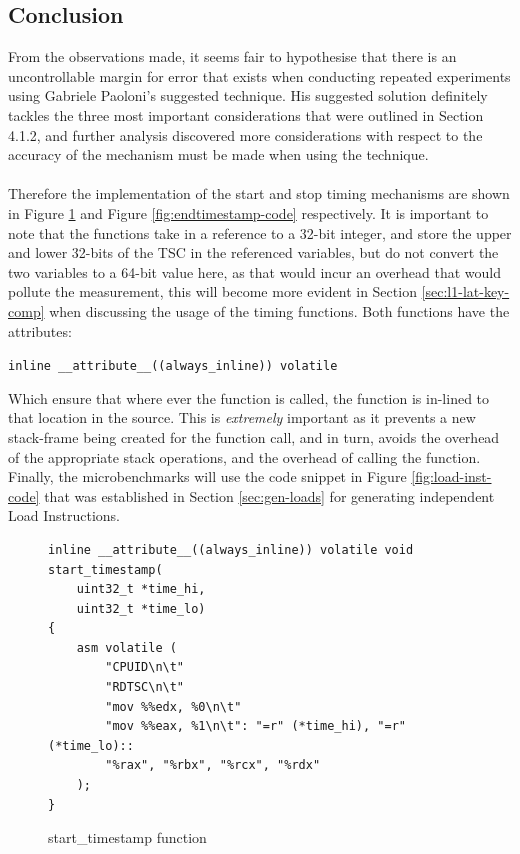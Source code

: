 \documentclass[bsc,frontabs,twoside,singlespacing,parskip,deptreport]{infthesis}     %
\begin{document}

\subsection{Conclusion}
From the observations made, it seems fair to hypothesise that there is an uncontrollable margin for error that exists when conducting repeated experiments using Gabriele Paoloni's suggested technique\cite{code_exec_times}. His suggested solution definitely tackles the three most important considerations that were outlined in Section 4.1.2, and further analysis discovered more considerations with respect to the accuracy of the mechanism must be made when using the technique. \\
\\
Therefore the implementation of the start and stop timing mechanisms are shown in Figure \ref{fig:starttimestamp-code} and Figure \ref{fig:endtimestamp-code} respectively. It is important to note that the functions take in a reference to a 32-bit integer, and store the upper and lower 32-bits of the TSC in the referenced variables, but do not convert the two variables to a 64-bit value here, as that would incur an overhead that would pollute the measurement, this will become more evident in Section \ref{sec:l1-lat-key-comp} when discussing the usage of the timing functions. Both functions have the attributes:
    
    \begin{center}
        \texttt{inline \_\_attribute\_\_((always\_inline)) volatile}
    \end{center}
Which ensure that where ever the function is called, the function is in-lined to that location in the source. This is \emph{extremely} important as it prevents a new stack-frame being created for the function call, and in turn, avoids the overhead of the appropriate stack operations, and the overhead of calling the function. Finally, the microbenchmarks will use the code snippet in Figure \ref{fig:load-inst-code} that was established in Section \ref{sec:gen-loads} for generating independent Load Instructions.

\begin{figure}[h!]
    \centering
    \begin{verbatim}
inline __attribute__((always_inline)) volatile void start_timestamp(
    uint32_t *time_hi,
    uint32_t *time_lo)
{
    asm volatile (
        "CPUID\n\t"
        "RDTSC\n\t"
        "mov %%edx, %0\n\t"
        "mov %%eax, %1\n\t": "=r" (*time_hi), "=r" (*time_lo)::
        "%rax", "%rbx", "%rcx", "%rdx"
    );
}
    \end{verbatim}
    \caption{start\_timestamp function}
    \label{fig:starttimestamp-code}
\end{figure}
\end{document}
